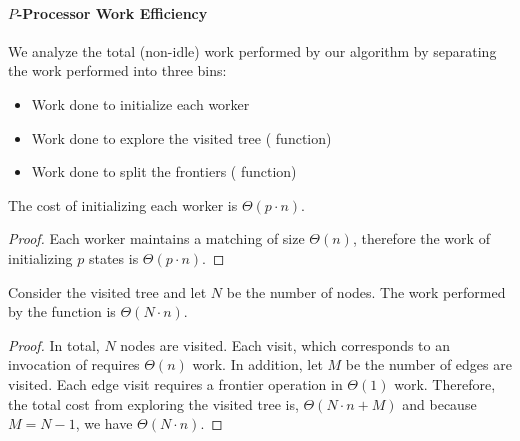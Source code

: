 \paragraph{$P$-Processor Work Efficiency}

We analyze the total (non-idle) work performed by our algorithm by
separating the work performed into three bins:
\begin{itemize}
\item Work done to initialize each worker
\item Work done to explore the visited tree ( function)
\item Work done to split the frontiers ( function)
\end{itemize}

\begin{lemma}\label{lem:init-costs}
  The cost of initializing each worker is $\Theta(p \cdot n)$.
\end{lemma}

\begin{proof}
  Each worker maintains a matching of size $\Theta(n)$, therefore
  the work of initializing $p$ states is $\Theta(p \cdot n)$.
\end{proof}

\begin{lemma}\label{lem:exp-cost}
  Consider the visited tree and let $N$ be the number of nodes.
  The work performed by the  function is $\Theta(N \cdot n)$.
\end{lemma}

\begin{proof}
  In total, $N$ nodes are visited. Each visit, which corresponds to an
  invocation of  requires $\Theta(n)$ work.
  In addition, let $M$ be the number of edges are visited. Each edge visit
  requires a frontier  operation in $\Theta(1)$ work.
  Therefore, the total cost from exploring the visited tree is,
  $\Theta(N \cdot n + M)$ and because $M = N - 1$, we have $\Theta(N
  \cdot n)$.
\end{proof}
%


